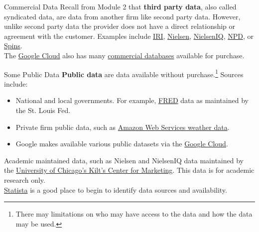 \documentclass[pdf]{beamer}
\newcommand{\empr}[1]{{\color{franklinblue}\textbf{#1}}}
\theoremstyle{remark}
\theoremstyle{definition}
\begin{document}
\begin{frame}[t]{Commercial Data}
Recall from Module 2 that \empr{third party data}, also called syndicated data, are data from another firm like second party data.  However, unlike second party data the provider does not have a direct relationship or
agreement with the customer.  Examples include \href{https://www.iriworldwide.com/en-us}{IRI}, \href{https://www.nielsen.com/}{Nielsen}, \href{https://nielseniq.com/global/en/}{NielsenIQ}, \href{https://www.npd.com/}{NPD}, or \href{https://www.spins.com/}{Spins}. \\
\vspace{1.5ex}
The \href{https://cloud.google.com/}{Google Cloud} also has many \href{https://cloud.google.com/datasets}{commercial databases} available for purchase. 
\end{frame}

\begin{frame}[t]{Some Public Data}
\empr{Public data} are data available without purchase.\footnote{There may limitations on who may have access to the data and how the data may be used.} Sources include:\\
\vspace{-0.5ex}
\small
\begin{itemize}
  \item National and local governments.  For example, \href{https://fred.stlouisfed.org/}{FRED} data as maintained by the St. Louis Fed.
  \item Private firm public data, such as \href{https://docs.aws.amazon.com/forecast/latest/dg/weather.html}{Amazon Web Services weather data}.
  \item Google makes available various public datasets via the \href{https://console.cloud.google.com/marketplace/browse?filter=solution-type:dataset&_ga=2.201899609.935088507.1674489775-2008566173.1674489775}{Google Cloud}.
 \end{itemize}
 \normalsize
 \vspace{-0.5ex}
 Academic maintained data, such as Nielsen and NielsenIQ data maintained by the \href{https://www.chicagobooth.edu/research/kilts/research-data}{University of Chicago's Kilt's Center for Marketing}.  This data is for academic research only. \\
\vspace{1.5ex}
\href{https://www.statista.com/}{Statista}  is a good place to begin to identify data sources and availability. 
\end{frame}
\end{document}
